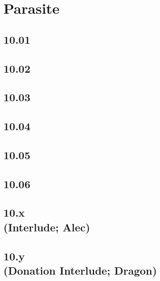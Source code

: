 \part{Parasite}

\chapter{10.01}


\chapter{10.02}


\chapter{10.03}


\chapter{10.04}


\chapter{10.05}


\chapter{10.06}


\chapter[10.x (Interlude; Alec)]{10.x\\(Interlude; Alec)}


\chapter[10.y (Donation Interlude; Dragon)]{10.y\\(Donation Interlude; Dragon)}

